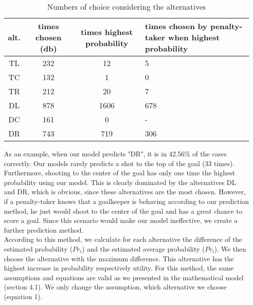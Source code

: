 \documentclass[12pt,dvipsnames]{article}%
\begin{document}
  \begin{table}[ht]
\caption{Numbers of choice considering the alternatives}
\centering
\small
\begin{tabular}{  c |  c | c | p{5cm}  }
   alt. & times chosen (db) & times highest probability & times chosen by penalty-taker when highest probability   \\
   \hline

TL  & 232 &  12  &  5    \\  

TC  & 132  & 1    & 0    \\ 

TR   & 212 & 20  &  7    \\ 

DL  & 878 & 1606    & 678    \\ 

DC  & 161 & 0   &  -    \\ 

DR  & 743 & 719   &  306    \\ 

 \end{tabular}
 \end{table}
 
 \vspace{-0.2cm}
 
As an example, when our model predicts "DR", it is in 42.56\% of the cases correctly. Our models rarely predicts a shot to the top of the goal (33 times). Furthermore, shooting to the center of the goal has only one time the highest probability using our model. This is clearly dominated by the alternatives DL and DR, which is obvious, since these alternatives are the most chosen. However, if a penalty-taker knows that a goalkeeper is behaving according to our prediction method, he just would shoot to the center of the goal and has a great chance to score a goal. Since this scenario would make our model ineffective, we create a further prediction method. \\
According to this method, we calculate for each alternative the difference of the estimated probability ($Pr_i$) and the estimated average probability ($\overline{Pr_i}$). We then choose the alternative with the maximum difference. This alternative has the highest increase in probability respectively utility. For this method, the same assumptions and equations are valid as we presented in the mathematical model (section 4.1). We only change the assumption, which alternative we choose (equation 1). 

\vspace{-1.35cm}
\end{document}
